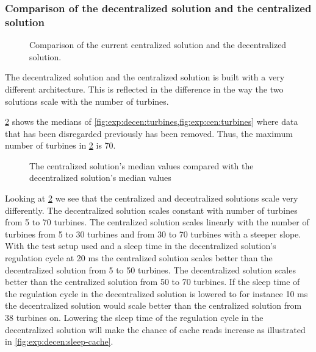 \subsubsection{Comparison of the decentralized solution and the centralized solution}
\label{sec:comp:decentralizedVScentralized}

\begin{figure}[!h]
	\centering
	
	\caption[Comparison of the current centralized solution and the decentralized solution]{
		\label{fig:projectDiffOverviewCentralizedDecentralized1}
		\footnotesize{%
			Comparison of the current centralized solution and the decentralized solution.
		}
	}
\end{figure}

The decentralized solution and the centralized solution is built with a very different architecture. This is reflected in the difference in the way the two solutions scale with the number of turbines.

\cref{fig:exp:cenVSDecen} shows the medians of \cref{fig:exp:decen:turbines,fig:exp:cen:turbines} where data that has been disregarded previously has been removed. Thus, the maximum number of turbines in \cref{fig:exp:cenVSDecen} is 70. 

\begin{figure}[h!]
	\centering
		
	\caption{The centralized solution's median values compared with the decentralized solution's median values}
	\label{fig:exp:cenVSDecen}
\end{figure}

Looking at \cref{fig:exp:cenVSDecen} we see that the centralized and decentralized solutions scale very differently.
The decentralized solution scales constant with number of turbines from 5 to 70 turbines. The centralized solution scales linearly with the number of turbines from 5 to 30 turbines and from 30 to 70 turbines with a steeper slope. With the test setup used and a sleep time in the decentralized solution's regulation cycle at 20 ms the centralized solution scales better than the decentralized solution from 5 to 50 turbines. The decentralized solution scales better than the centralized solution from 50 to 70 turbines.
If the sleep time of the regulation cycle in the decentralized solution is lowered to for instance 10 ms the decentralized solution would scale better than the centralized solution from 38 turbines on. Lowering the sleep time of the regulation cycle in the decentralized solution will make the chance of cache reads increase as illustrated in \cref{fig:exp:decen:sleep-cache}.

